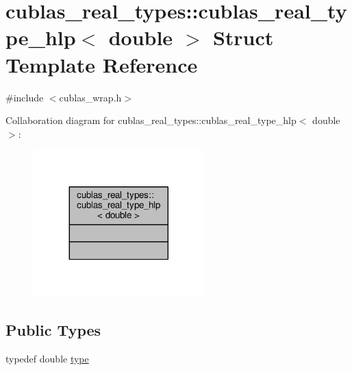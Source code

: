 \hypertarget{structcublas__real__types_1_1cublas__real__type__hlp_3_01double_01_4}{\section{cublas\-\_\-real\-\_\-types\-:\-:cublas\-\_\-real\-\_\-type\-\_\-hlp$<$ double $>$ Struct Template Reference}
\label{structcublas__real__types_1_1cublas__real__type__hlp_3_01double_01_4}
}


{\ttfamily \#include $<$cublas\-\_\-wrap.\-h$>$}



Collaboration diagram for cublas\-\_\-real\-\_\-types\-:\-:cublas\-\_\-real\-\_\-type\-\_\-hlp$<$ double $>$\-:\nopagebreak
\begin{figure}[H]
\begin{center}
\leavevmode
\includegraphics[width=188pt]{structcublas__real__types_1_1cublas__real__type__hlp_3_01double_01_4__coll__graph}
\end{center}
\end{figure}
\subsection*{Public Types}
\begin{DoxyCompactItemize}
\item 
typedef double \hyperlink{structcublas__real__types_1_1cublas__real__type__hlp_3_01double_01_4_ac11479e7b81a80ff99ba21fad166d819}{type}
\end{DoxyCompactItemize}


